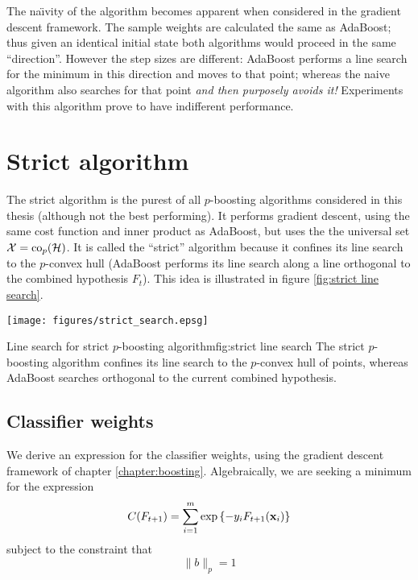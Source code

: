 The na\"{\i}vity of the algorithm becomes apparent when considered in
the gradient descent framework.  The sample weights are calculated
the same as AdaBoost; thus given an identical initial state both
algorithms would proceed in the same ``direction''.  However the step
sizes are different: AdaBoost performs a line search for the minimum
in this direction and moves to that point; whereas the naive algorithm
also searches for that point \emph{and then purposely avoids it!}
Experiments with this algorithm prove to have indifferent performance.

\section{Strict algorithm}

The strict algorithm is the purest of all $p$-boosting algorithms
considered in this thesis (although not the best performing).  It
performs gradient descent, using the 
same cost function and inner product as AdaBoost, but uses the the
universal set $\mathcal{X} = \mathrm{co}_p(\mathcal{H})$.  It is called the ``strict''
algorithm because it confines its line search to the $p$-convex hull
(AdaBoost performs its line search along a line orthogonal to the
combined hypothesis $F_{t}$).  This idea is illustrated in figure
\ref{fig:strict line search}. 

\begin{linefigure}
\begin{center}
\texttt{[image: figures/strict\_search.epsg]}
\end{center}
\begin{capt}{Line search for strict $p$-boosting algorithm}{fig:strict
line search}
The strict $p$-boosting algorithm confines its line search to the
$p$-convex hull of points, whereas AdaBoost searches orthogonal to the
current combined hypothesis.
\end{capt}
\end{linefigure}

\subsection{Classifier weights}

We derive an expression for the classifier weights, using the gradient
descent framework of chapter \ref{chapter:boosting}.  Algebraically, we
are seeking a minimum for the expression 
%
\begin{equation}
\label{eqn:classifier weight cost function approximation}
C(F_{t+1}) = \sum_{i=1}^{m} \exp \left\{ -y_i F_{t+1}(\mathbf{x}_i) \right\}
\end{equation}
%
subject to the constraint that
%
\begin{equation}
\| b \|_{p} = 1
\end{equation}

